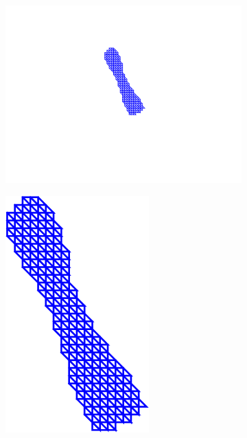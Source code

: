 \begin{figure}[t!]
    \centering
    \begin{subfigure}[b]{0.1\textwidth}
            \includegraphics[width=\textwidth]{resources/Fig_Flows/0}
    \end{subfigure}
    \hfill
    \begin{subfigure}[b]{0.1\textwidth}
            \includegraphics[width=\textwidth]{resources/Fig_Flows/1}

\end{subfigure}
\end{figure}
